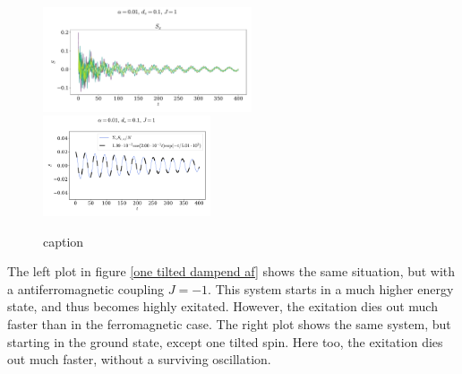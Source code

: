 \documentclass{article}
\begin{document}
    \begin{figure}
        \centering
        \includegraphics[width=0.55\textwidth]{../plots/2224.pdf}
        \includegraphics[width=0.44\textwidth]{../plots/2224fit.pdf}
        \caption{caption}
        \label{one tilted dampend}
    \end{figure}

    The left plot in figure \ref{one tilted dampend af} shows the same situation, but with a antiferromagnetic coupling $J = -1$. This system starts in a much higher energy state, and thus becomes highly exitated. However, the exitation dies out much faster than in the ferromagnetic case. The right plot shows the same system, but starting in the ground state, except one tilted spin. Here too, the exitation dies out much faster, without a surviving oscillation.
\end{document}
